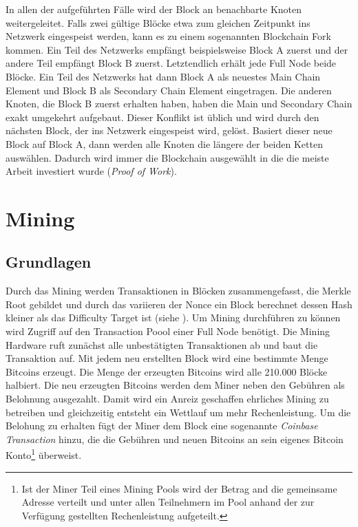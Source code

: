 \documentclass[ngerman,runningheads,a4paper]{llncs}[2018/03/10]
\begin{document}
In allen der aufgeführten Fälle wird der Block an benachbarte Knoten weitergeleitet. Falls zwei gültige Blöcke etwa zum gleichen Zeitpunkt ins Netzwerk eingespeist werden, kann es zu einem sogenannten Blockchain Fork kommen. Ein Teil des Netzwerks empfängt beispielsweise Block A zuerst und der andere Teil empfängt Block B zuerst. Letztendlich erhält jede Full Node beide Blöcke. Ein Teil des Netzwerks hat dann Block A als neuestes Main Chain Element und Block B als Secondary Chain Element eingetragen. Die anderen Knoten, die Block B zuerst erhalten haben, haben die Main und Secondary Chain exakt umgekehrt aufgebaut. Dieser Konflikt ist üblich und wird durch den nächsten Block, der ins Netzwerk eingespeist wird, gelöst. Basiert dieser neue Block auf Block A, dann werden alle Knoten die längere der beiden Ketten auswählen. Dadurch wird immer die Blockchain ausgewählt in die die meiste Arbeit investiert wurde (\textit{Proof of Work}).


\section{Mining}\label{sec:mining}

\subsection{Grundlagen}\label{sec:miningGrundlagen}

Durch das Mining werden Transaktionen in Blöcken zusammengefasst, die Merkle Root gebildet und durch das variieren der Nonce ein Block berechnet dessen Hash kleiner als das Difficulty Target ist (siehe ). Um Mining durchführen zu können wird Zugriff auf den Transaction Poool einer Full Node benötigt. Die Mining Hardware ruft zunächst alle unbestätigten Transaktionen ab und baut die Transaktion auf. Mit jedem neu erstellten Block wird eine bestimmte Menge Bitcoins erzeugt. Die Menge der erzeugten Bitcoins wird alle 210.000 Blöcke halbiert. Die neu erzeugten Bitcoins werden dem Miner neben den Gebühren als Belohnung ausgezahlt. Damit wird ein Anreiz geschaffen ehrliches Mining zu betreiben und gleichzeitig entsteht ein Wettlauf um mehr Rechenleistung. Um die Belohung zu erhalten fügt der Miner dem Block eine sogenannte \textit{Coinbase Transaction} hinzu, die die Gebühren und neuen Bitcoins an sein eigenes Bitcoin Konto\footnote{Ist der Miner Teil eines Mining Pools wird der Betrag and die gemeinsame Adresse verteilt und unter allen Teilnehmern im Pool anhand der zur Verfügung gestellten Rechenleistung aufgeteilt.} überweist.  
\end{document}
